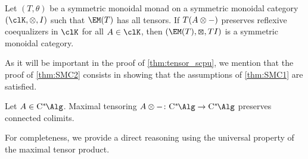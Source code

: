 \begin{theorem}\label{thm:SMC2}
	Let $(T,\theta)$ be a symmetric monoidal monad on a symmetric monoidal category $(\clK,\otimes ,I)$ such that $\EM(T)$ has all tensors.
	If $T({A}\otimes -)$ preserves reflexive coequalizers in $\clK$ for all $\A \in \clK$, then $(\EM(T),\kocktensor,TI)$ is a symmetric monoidal category.
\end{theorem}
As it will be important in the proof of \cref{thm:tensor_scpu}, we mention that the proof of \cref{thm:SMC2} consists in showing that the assumptions of \cref{thm:SMC1} are satisfied.

\begin{proposition}\label{prop:tensor_colims}
	Let $\A\in \Calg$.
	Maximal tensoring $\A\otimes - \colon \Calg\to \Calg$ preserves connected colimits.
\end{proposition}
For completeness, we provide a direct reasoning using the universal property of the maximal tensor product.

